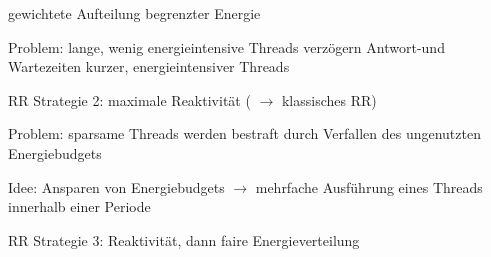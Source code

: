 \documentclass[a4paper]{article}
\begin{document}
\begin{multicols}{3}
\begin{itemize*}
\begin{itemize*}
            \item gewichtete Aufteilung begrenzter Energie %
            \item Problem: lange, wenig energieintensive Threads verzögern Antwort-und Wartezeiten kurzer, energieintensiver Threads
        \end{itemize*}
        \item RR Strategie 2: maximale Reaktivität ( $\rightarrow$ klassisches RR)
        \begin{itemize*}
            \item Problem: sparsame Threads werden bestraft durch Verfallen des ungenutzten Energiebudgets
            \item Idee: Ansparen von Energiebudgets $\rightarrow$ mehrfache Ausführung eines Threads innerhalb einer Periode
        \end{itemize*}
        \item RR Strategie 3: Reaktivität, dann faire Energieverteilung
    \end{itemize*}


\end{multicols}
\end{document}
